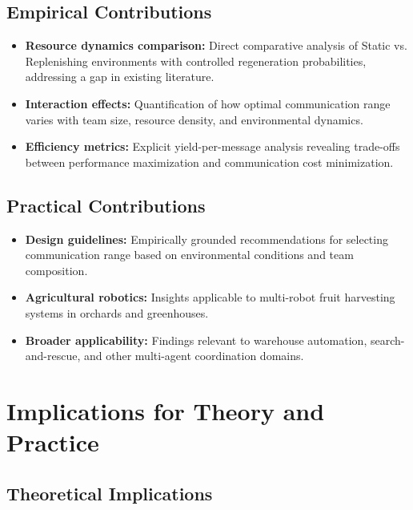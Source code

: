 \subsection{Empirical Contributions}

\begin{itemize}
    \item \textbf{Resource dynamics comparison:} Direct comparative analysis of Static vs. Replenishing environments with controlled regeneration probabilities, addressing a gap in existing literature.
    
    \item \textbf{Interaction effects:} Quantification of how optimal communication range varies with team size, resource density, and environmental dynamics.
    
    \item \textbf{Efficiency metrics:} Explicit yield-per-message analysis revealing trade-offs between performance maximization and communication cost minimization.
\end{itemize}

\subsection{Practical Contributions}

\begin{itemize}
    \item \textbf{Design guidelines:} Empirically grounded recommendations for selecting communication range based on environmental conditions and team composition.
    
    \item \textbf{Agricultural robotics:} Insights applicable to multi-robot fruit harvesting systems in orchards and greenhouses.
    
    \item \textbf{Broader applicability:} Findings relevant to warehouse automation, search-and-rescue, and other multi-agent coordination domains.
\end{itemize}

\section{Implications for Theory and Practice}

\subsection{Theoretical Implications}

